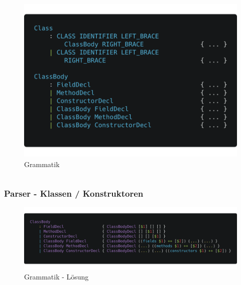 \begin{frame}
\begin{columns}[T]
\begin{column}{.48\textwidth}
	\pause
	\begin{figure}[H]
		\centering
		\includegraphics[width=0.95\linewidth]{images/parser/class-ast.png}
		\caption{Grammatik}
		\label{fig:images/parser/class-ast}
	\end{figure}
	\end{column}%
	\end{columns}
\end{frame}

\begin{frame}[fragile]
	\frametitle{Parser - Klassen / Konstruktoren}
	\begin{figure}[H]
		\centering
		\includegraphics[width=0.9\linewidth]{images/parser/full-class-ast.png}
		\caption{Grammatik - Lösung}
		\label{fig:images/parser/full-class-ast}
	\end{figure}
\end{frame}

